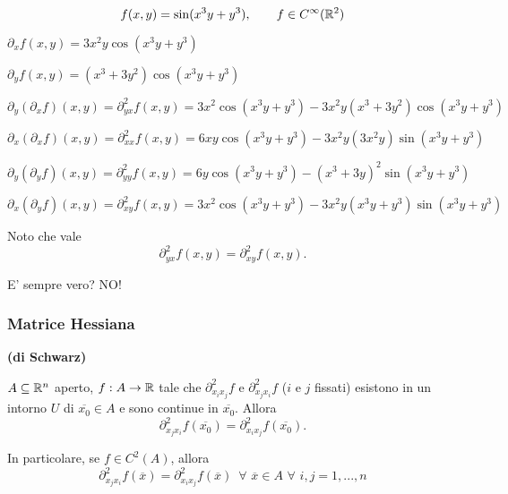 \newpage %
\begin{exbar}
	$$f(x,y)=\sin(x^3y+y^3), \qquad f \in C^\infty(\mathbb{R}^2)$$
	
	$\partial_xf(x,y)=3x^2y \cos(x^3y+y^3)$
	
	$\partial_y f(x,y)=(x^3+3y^2)\cos(x^3y+y^3)$
	
	$\partial_y(\partial_xf)(x,y)=\partial_{yx}^2f(x,y)=3x^2 \cos(x^3y+y^3)-3x^2y(x^3+3y^2)\cos(x^3y+y^3)$
	
	$\partial_x(\partial_x f)(x,y)= \partial_{xx}^2f(x,y)=6xy\cos(x^3y+y^3)-3x^2y(3x^2y)\sin(x^3y+y^3)$
	
	$\partial_y(\partial_y f)(x,y)=\partial_{yy}^2f(x,y)=6y\cos(x^3y+y^3)-(x^3+3y)^2\sin(x^3y+y^3)$
	
	$\partial_x(\partial_y f)(x,y)=\partial_{xy}^2f(x,y)=3x^2\cos(x^3y+y^3)-3x^2y(x^3y+y^3)\sin(x^3y+y^3)$
	
	Noto che vale
	\begin{equation*}
		\partial_{yx}^2f(x,y)=\partial_{xy}^2f(x,y).
	\end{equation*}
	
	E' sempre vero? NO!
\end{exbar}


\subsubsection{Matrice Hessiana}
\begin{theorem} \textbf{(di Schwarz)}
	
	$A \subseteq\mathbb{R}^n$ aperto, $f:A\rightarrow\mathbb{R}$ tale che $\partial_{x_ix_j}^2f$ e $\partial_{x_jx_i}^2f$ ($i$ e $j$ fissati) esistono in un intorno $U$ di $\overline{x_0}\in A$ e sono continue in $\overline{x_0}$. Allora
	\begin{equation*}
		\partial_{x_jx_i}^2f(\overline{x_0})=\partial_{x_ix_j}^2f(\overline{x_0}).
	\end{equation*}
	
	In particolare, se $f \in C^2(A)$, allora 
	\begin{equation*}
		\partial_{x_jx_i}^2f(\overline{x})=\partial_{x_ix_j}^2f(\overline{x})\,\,\, \forall\,\, \overline{x} \in A\,\, \forall \,\,i,j=1,...,n 
	\end{equation*}  
\end{theorem}


